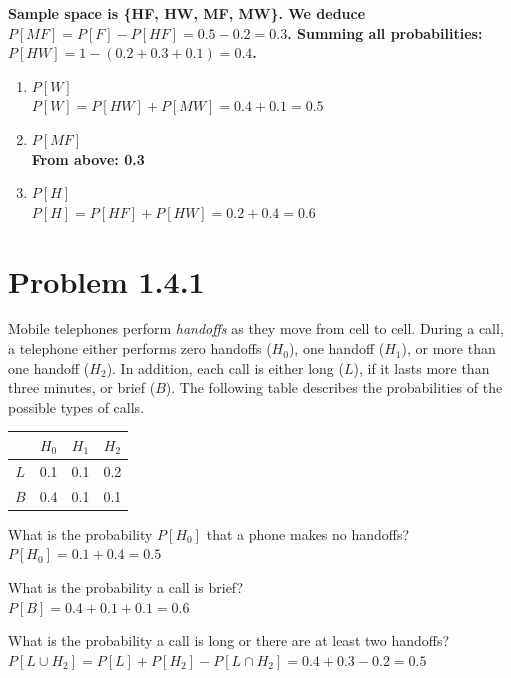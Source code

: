 \documentclass{article}
\begin{document}
{\boldmath\textbf{Sample space is \{HF, HW, MF, MW\}.
We deduce $P[MF] = P[F] - P[HF] = 0.5 - 0.2 = 0.3$.
Summing all probabilities: $P[HW] = 1 - (0.2 + 0.3 + 0.1) = 0.4$.}}

\begin{enumerate}[label=(\alph*)]
    \item $P[W]$ \\
    {\boldmath\textbf{$P[W] = P[HW] + P[MW] = 0.4 + 0.1 = 0.5$}}
    
    \item $P[MF]$ \\
    {\boldmath\textbf{From above: 0.3}}
    
    \item $P[H]$ \\
    {\boldmath\textbf{$P[H] = P[HF] + P[HW] = 0.2 + 0.4 = 0.6$}}
\end{enumerate}

\newpage

\section*{Problem 1.4.1}
Mobile telephones perform \textit{handoffs} as they move from cell to cell. During a call, a telephone either performs zero handoffs ($H_0$), one handoff ($H_1$), or more than one handoff ($H_2$). In addition, each call is either long ($L$), if it lasts more than three minutes, or brief ($B$). The following table describes the probabilities of the possible types of calls.

\begin{center}
\begin{tabular}{c|ccc}
 & $H_0$ & $H_1$ & $H_2$ \\
\hline
$L$ & 0.1 & 0.1 & 0.2 \\
$B$ & 0.4 & 0.1 & 0.1
\end{tabular}
\end{center}

\noindent
\noindent
What is the probability $P[H_0]$ that a phone makes no handoffs? \\
{\boldmath\textbf{$P[H_0] = 0.1 + 0.4 = 0.5$}}

\noindent
What is the probability a call is brief? \\
{\boldmath\textbf{$P[B] = 0.4 + 0.1 + 0.1 = 0.6$}}

\noindent
What is the probability a call is long or there are at least two handoffs? \\
{\boldmath\textbf{$P[L \cup H_2] = P[L] + P[H_2] - P[L \cap H_2] = 0.4 + 0.3 - 0.2 = 0.5$}}
\end{document}

